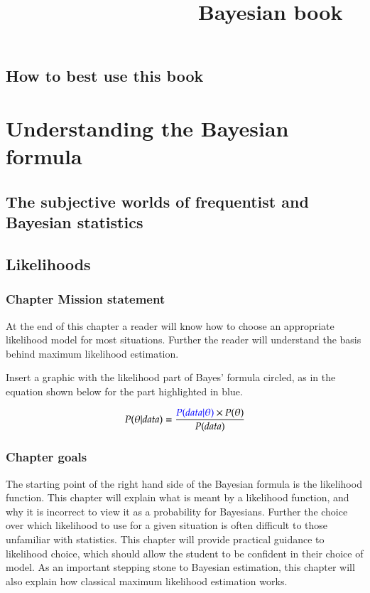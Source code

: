 \documentclass[11pt,fullpage]{book}
\title{\textbf{~~~~~~~~~~~~~~~}\newline Bayesian book}
\author{}
\begin{document}
\tableofcontents
\chapter{How to best use this book}
\part{Understanding the Bayesian formula}
\chapter{The subjective worlds of frequentist and Bayesian statistics}

\chapter{Likelihoods}
\section{Chapter Mission statement}
At the end of this chapter a reader will know how to choose an appropriate likelihood model for most situations. Further the reader will understand the basis behind maximum likelihood estimation.

Insert a graphic with the likelihood part of Bayes' formula circled, as in the equation shown below for the part highlighted in blue.

\begin{equation}
P(\theta|data) = \frac{{\color{blue}P(data|\theta)}\times P(\theta)}{P(data)}
\end{equation}\label{eq:Likelihood_BayesHighlighted}

\section{Chapter goals}
The starting point of the right hand side of the Bayesian formula is the likelihood function. This chapter will explain what is meant by a likelihood function, and why it is incorrect to view it as a probability for Bayesians. Further the choice over which likelihood to use for a given situation is often difficult to those unfamiliar with statistics. This chapter will provide practical guidance to likelihood choice, which should allow the student to be confident in their choice of model. As an important stepping stone to Bayesian estimation, this chapter will also explain how classical maximum likelihood estimation works. 
\end{document}
